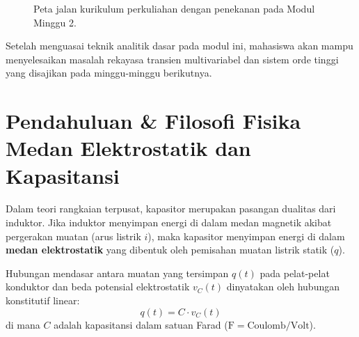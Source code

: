 \documentclass[11pt,a4paper]{article}
\theoremstyle{definition}
\begin{document}
\begin{figure}[htbp]
{%
}
\caption{Peta jalan kurikulum perkuliahan dengan penekanan pada Modul Minggu 2.}
\label{fig:peta_jalan_pd_w2}
\end{figure}

Setelah menguasai teknik analitik dasar pada modul ini, mahasiswa akan mampu menyelesaikan masalah rekayasa transien multivariabel dan sistem orde tinggi yang disajikan pada minggu-minggu berikutnya.

\section{Pendahuluan \& Filosofi Fisika Medan Elektrostatik dan Kapasitansi}

Dalam teori rangkaian terpusat, kapasitor merupakan pasangan dualitas dari induktor. Jika induktor menyimpan energi di dalam medan magnetik akibat pergerakan muatan (arus listrik $i$), maka kapasitor menyimpan energi di dalam \textbf{medan elektrostatik} yang dibentuk oleh pemisahan muatan listrik statik ($q$).

Hubungan mendasar antara muatan yang tersimpan $q(t)$ pada pelat-pelat konduktor dan beda potensial elektrostatik $v_C(t)$ dinyatakan oleh hubungan konstitutif linear:
\begin{equation}
    q(t) = C \cdot v_C(t)
    \label{eq:charge_voltage}
\end{equation}
di mana $C$ adalah kapasitansi dalam satuan Farad ($\text{F} = \text{Coulomb}/\text{Volt}$).
\end{document}
